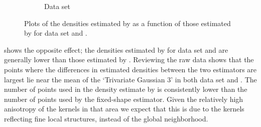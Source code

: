 \begin{figure}
\begin{subfigure}{0.3\textwidth}
				\caption{Data set \baakmanTwo}
				\label{fig:discussion:performance:mbevssambe:baakman2}
			\end{subfigure}
			\caption{Plots of the densities estimated by \sambe as a function of those estimated by \mbe for data set %
				\ferdosiTwo and %
				\baakmanTwo.
			}
			\label{fig:discussion:performance:two:mbevssambe}
		\end{figure}

		 shows the opposite effect; the densities estimated by \sambe for data set \ferdosiThree and \baakmanThree are generally lower than those estimated by \mbe. Reviewing the raw data shows that the points where the differences in estimated densities between the two estimators are largest lie near the mean of the `Trivariate Gaussian 3' in both data set \ferdosiThree and \baakmanThree. The number of points used in the density estimate by \sambe is consistently lower than the number of points used by the fixed-shape estimator. Given the relatively high anisotropy of the kernels in that area we expect that this is due to the kernels reflecting fine local structures, instead of the global neighborhood.
